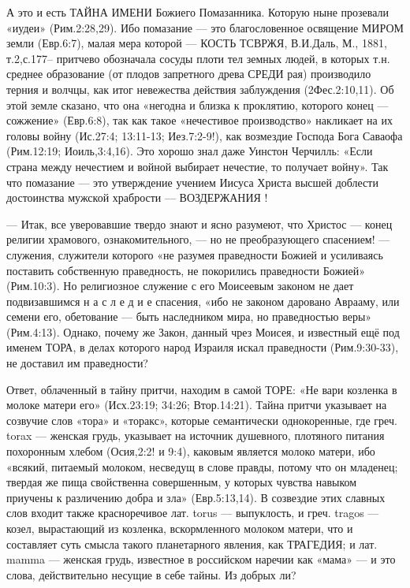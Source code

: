      А это и есть ТАЙНА  ИМЕНИ  Божиего Помазанника. Которую ныне прозевали «иудеи» (Рим.2:28,29).
Ибо помазание --- это благословенное освящение МИРОМ земли (Евр.6:7), малая мера которой --- КОСТЬ {ТСВРЖЯ, В.И.Даль, М., 1881, т.2,с.177}– притчево обозначала сосуды плоти тел земных людей, в которых т.н. среднее образование (от плодов запретного древа СРЕДИ рая) производило терния и волчцы, как итог невежества действия заблуждения (2Фес.2:10,11).  Об этой земле сказано, что она  «негодна и близка к проклятию, которого конец --- сожжение» (Евр.6:8), так как такое «нечестивое производство» накликает на их головы войну (Ис.27:4; 13:11-13;  Иез.7:2-9!), как возмездие Господа Бога Саваофа (Рим.12:19; Иоиль,3:4,16). Это хорошо знал даже Уинстон Черчилль: «Если страна между нечестием и войной выбирает нечестие, то получает войну». Так что помазание --- это утверждение учением Иисуса Христа высшей доблести достоинства мужской храбрости --- ВОЗДЕРЖАНИЯ !

    --- Итак, все уверовавшие твердо знают и ясно разумеют, что Христос --- конец религии храмового, ознакомительного, --- но не преобразующего спасением! --- служения, служители которого «не разумея праведности Божией и усиливаясь поставить собственную праведность, не покорились праведности Божией» (Рим.10:3). Но религиозное служение с его Моисеевым законом не дает подвизавшимся  н а с л е д и е  спасения, «ибо не законом даровано Аврааму, или семени его, обетование --- быть наследником мира, но праведностью веры» (Рим.4:13).  Однако, почему же Закон, данный чрез Моисея, и известный ещё под именем ТОРА, в делах которого народ Израиля искал праведности (Рим.9:30-33), не доставил им праведности?

      Ответ, облаченный в тайну притчи, находим в самой ТОРЕ: «Не вари козленка в молоке матери его» (Исх.23:19; 34:26; Втор.14:21). Тайна притчи указывает на созвучие слов «тора» и «торакс», которые семантически однокоренные, где греч. torax --- женская грудь, указывает на источник душевного, плотяного питания похоронным хлебом (Осия,2:2! и 9:4), каковым является молоко матери, ибо «всякий, питаемый молоком, несведущ в слове правды, потому что он младенец; твердая же пища свойственна совершенным, у которых чувства навыком приучены к различению добра и зла» (Евр.5:13,14). В созвездие этих славных слов входит также красноречивое лат. torus --- выпуклость, и греч. tragos --- козел, вырастающий из козленка, вскормленного молоком матери, что и составляет суть смысла такого планетарного явления, как  ТРАГЕДИЯ;  и лат. mamma --- женская грудь, известное в российском наречии как «мама» --- и это слова, действительно несущие в себе тайны.   Из добрых ли?

